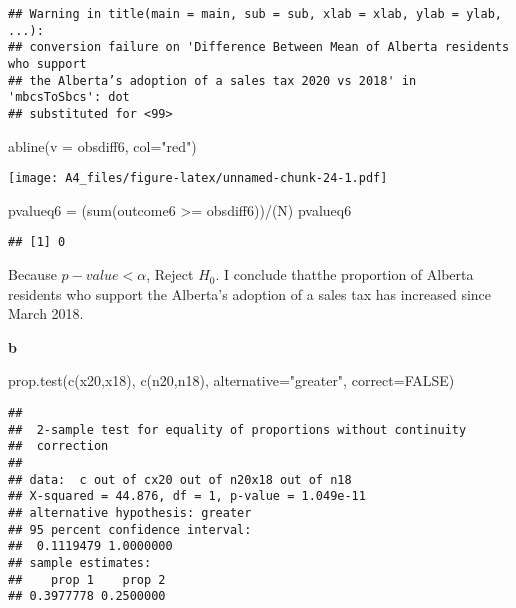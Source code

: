 \documentclass[
]{article}
\newenvironment{Shaded}{\begin{snugshade}}{\end{snugshade}}
\newcommand{\AttributeTok}[1]{\textcolor[rgb]{0.77,0.63,0.00}{#1}}
\newcommand{\ConstantTok}[1]{\textcolor[rgb]{0.00,0.00,0.00}{#1}}
\newcommand{\FunctionTok}[1]{\textcolor[rgb]{0.00,0.00,0.00}{#1}}
\newcommand{\NormalTok}[1]{#1}
\newcommand{\OtherTok}[1]{\textcolor[rgb]{0.56,0.35,0.01}{#1}}
\newcommand{\SpecialCharTok}[1]{\textcolor[rgb]{0.00,0.00,0.00}{#1}}
\newcommand{\StringTok}[1]{\textcolor[rgb]{0.31,0.60,0.02}{#1}}
\begin{document}
\begin{verbatim}
## Warning in title(main = main, sub = sub, xlab = xlab, ylab = ylab, ...):
## conversion failure on 'Difference Between Mean of Alberta residents who support
## the Alberta’s adoption of a sales tax 2020 vs 2018' in 'mbcsToSbcs': dot
## substituted for <99>
\end{verbatim}

\begin{Shaded}
\begin{Highlighting}[]
\FunctionTok{abline}\NormalTok{(}\AttributeTok{v =}\NormalTok{ obsdiff6, }\AttributeTok{col=}\StringTok{"red"}\NormalTok{)}
\end{Highlighting}
\end{Shaded}

\texttt{[image: A4\_files/figure-latex/unnamed-chunk-24-1.pdf]}

\begin{Shaded}
\begin{Highlighting}[]
\NormalTok{pvalueq6 }\OtherTok{=}\NormalTok{ (}\FunctionTok{sum}\NormalTok{(outcome6 }\SpecialCharTok{\textgreater{}=}\NormalTok{ obsdiff6))}\SpecialCharTok{/}\NormalTok{(N)}
\NormalTok{pvalueq6}
\end{Highlighting}
\end{Shaded}

\begin{verbatim}
## [1] 0
\end{verbatim}

Because \(p-value < \alpha\), Reject \(H_{0}\). I conclude thatthe
proportion of Alberta residents who support the Alberta's adoption of a
sales tax has increased since March 2018.

\textbf{b}

\begin{Shaded}
\begin{Highlighting}[]
\FunctionTok{prop.test}\NormalTok{(}\FunctionTok{c}\NormalTok{(x20,x18), }\FunctionTok{c}\NormalTok{(n20,n18), }\AttributeTok{alternative=}\StringTok{"greater"}\NormalTok{, }\AttributeTok{correct=}\ConstantTok{FALSE}\NormalTok{)}
\end{Highlighting}
\end{Shaded}

\begin{verbatim}
## 
##  2-sample test for equality of proportions without continuity
##  correction
## 
## data:  c out of cx20 out of n20x18 out of n18
## X-squared = 44.876, df = 1, p-value = 1.049e-11
## alternative hypothesis: greater
## 95 percent confidence interval:
##  0.1119479 1.0000000
## sample estimates:
##    prop 1    prop 2 
## 0.3977778 0.2500000
\end{verbatim}
\end{document}
